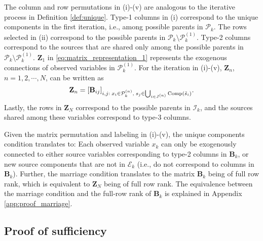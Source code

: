 \documentclass[12pt]{article}
\newtheorem{remark}{Remark}
\newcommand{\bB}{\mathbf{B}}
\begin{document}
The column and row permutations in (i)-(v) are analogous to the iterative process in Definition \ref{def:unique}. Type-1 columns in (i) correspond to the unique components in the first iteration, i.e., among possible parents in $\mathcal{P}_k$. The rows selected in (ii) correspond to the possible parents in $\mathcal{P}_k\setminus \mathcal{P}_k^{(1)}$. Type-2 columns correspond to the sources that are shared only among the possible parents in $\mathcal{P}_k\setminus \mathcal{P}_k^{(1)}$. $\mathbf{Z}_1$ in \eqref{eq:matrix_representation_1} represents the exogenous connections of observed variables in $\mathcal{P}_k^{(1)}$. For the iteration in (i)-(v), $\mathbf{Z}_n$, $n=1,2,\cdots, N$, can be written as
\begin{equation*}
    \mathbf{Z}_n = [\bB_{ij}]_{i,j: \; x_i\in \mathcal{P}_k^{(n)},\; s_j\in \bigcup_{i\in J^{(n)}} {\rm{Comp}}(\tilde{s}_i)}.
\end{equation*}
Lastly, the rows in $\mathbf{Z}_N$ correspond to the possible parents in $\mathcal{I}_k$, and the sources shared among these variables correspond to type-3 columns.

Given the matrix permutation and labeling in (i)-(v), the unique components condition
translates to: Each observed variable $x_k$ can only be exogenously connected to either source variables corresponding to type-2 columns in $\bB_k$, or new source components that are not in $\mathcal{E}_k$ (i.e., do not correspond to columns in $\bB_k$). Further, the marriage condition translates to the matrix $\bB_k$ being of full row rank, which is equivalent to $\mathbf{Z}_N$ being of full row rank. The equivalence between the marriage condition and the full-row rank of $\bB_k$ is explained in Appendix \ref{app:proof_marriage}.



\subsection{Proof of sufficiency}
\end{document}
